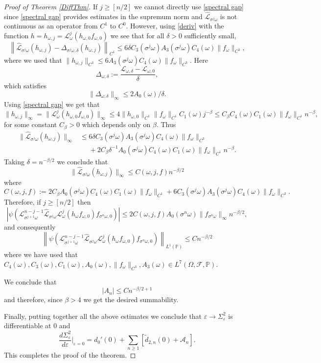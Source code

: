 \documentclass[11pt,reqno,a4paper]{article}
\theoremstyle{special}
\def\om{\omega}
\begin{document}
\begin{proof}[Proof of Theorem \ref{DiffThm}]
If $j\geq [n/2]$ we cannot directly use \eqref{spectral gap} since \eqref{spectral gap}  provides estimates in the supremum norm and $\hat{\mathcal L}_{\sigma^j\om}$ is not continuous as an operator from $C^1$ to $C^0$.  However, using \eqref{deriv} with the function $h=h_{\om,j}=\mathcal L_{\om}^j(h_{\om, 0} f_{\om, 0})$ we see that for all $\delta >0$ sufficiently small, 
$$
\left\|\hat{\mathcal L}_{\sigma^j\om}(h_{\om,j})-\Delta_{\sigma^j\om,\delta}(h_{\om,j})\right\|_{C^1}\leq 6\delta C_3(\sigma^j\om)A_3(\sigma^j\om)C_4(\om)\|f_\om\|_{C^3},
$$
where we used that $\|h_{\om,j}\|_{C^3}\leq 6A_3(\sigma^j\om)C_4(\om)\|f_\om\|_{C^3}$. Here 
$$
\Delta_{\om,\delta}:=\frac{\mathcal L_{\om, \delta}-\mathcal L_{\om, 0}}{\delta},
$$
which satisfies 
$$
\|\Delta_{\om,\delta}\|_{\infty}\leq 2A_0(\om)/\delta.
$$
Using \eqref{spectral gap} we get that 
$$
\|h_{\om,j}\|_\infty=\|\mathcal L_{\om}^j(h_{\om, 0} f_{\om, 0})\|_{\infty}\leq 4\|h_{\om, 0}\|_{C^1}\|f_\om\|_{C^1}C_1(\om)j^{-\beta}\leq C_\beta C_4(\om)C_1(\om)\|f_\om\|_{C^1}n^{-\beta},
$$
for some constant $C_\beta>0$ which depends only on $\beta$. 
Thus 
\[
\begin{split}
\|\hat{\mathcal L}_{\sigma^j\om}(h_{\om,j})\|_\infty &\leq  6\delta C_3(\sigma^j\om)A_3(\sigma^j\om)C_4(\om)\|f_\om\|_{C^3} \\
&\phantom{\leq}+2C_\beta\delta^{-1}A_0(\sigma^j\om) C_4(\om)C_1(\om)\|f_\om\|_{C^1}n^{-\beta}.
\end{split}
\]
Taking $\delta=n^{-\beta/2}$ we conclude that 
$$
\|\hat{\mathcal L}_{\sigma^j\om}(h_{\om,j})\|_\infty\leq C(\om,j,f)n^{-\beta/2}
$$
where 
$$
C(\om,j,f):=2C_\beta A_0(\sigma^j\om)C_4(\om)C_1(\om)\|f_\om\|_{C^1}+ 6C_3(\sigma^j\om)A_3(\sigma^j\om)C_4(\om)\|f_\om\|_{C^3}.
$$
Therefore, if $j \ge [n/2]$ then
$$
\left|\psi(\mathcal L_{\sigma^{j+1}\om}^{n-j-1}\hat{\mathcal L}_{\sigma^j\om}\mathcal L_{\om}^j(h_\om f_{\om, 0})f_{\sigma^n\om, 0})\right|\leq 2C(\om,j,f)A_0(\sigma^n\om)\|f_{\sigma^n\om}\|_\infty n^{-\beta/2},
$$
and consequently 
$$
\left\|\psi(\mathcal L_{\sigma^{j+1}\om}^{n-j-1}\hat{\mathcal L}_{\sigma^j\om}\mathcal L_{\om}^j(h_\om f_{\om, 0})f_{\sigma^n\om, 0})\right\|_{L^1(\mathbb P)}\leq Cn^{-\beta/2}
$$
where we have used that  $C_4(\om),C_3(\om),C_1(\om), A_0(\om), \|f_\om\|_{C^3}, A_3(\om)\in L^7(\Omega,\mathcal F,\mathbb P)$.


We conclude that 
$$
|A_n|\leq C n^{-\beta/2+1}
$$
and therefore, since  $\beta>4$ we get the desired summability. 





Finally, putting together all the above estimates  we conclude that $\varepsilon\to \Sigma^2_\varepsilon$ is differentiable at $0$ and
$$
\frac{d\Sigma_\varepsilon^2}{d\varepsilon}\Big|_{\varepsilon=0}=d_0'(0)+\sum_{n\geq 1}[\tilde d_{2,n}(0)+\mathcal A_n]. 
$$
This completes the proof of the theorem.
\end{proof}
\end{document}
